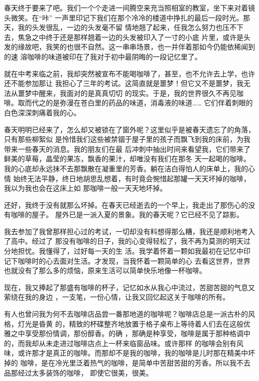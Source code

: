 \documentclass[12pt,a4paper]{article}
\begin{document}
		春天终于要来了吧。我们一个个走进一间腾空来充当照相室的教室，坐下来对着镜头微笑。在“咔”
	一声里印记下我们在那个冷冷的楼道中挣扎的最后一段时光。那天，我的头发很乱，一边的头发毫不留
	情地翘了起来，任我怎么努力也压不下去，焦急之中终于还是那样翘着一边的头发被印入了一寸的小底
	片里，或许是头发的缘故吧，我笑的也很不自然。这一串串场景，也一并伴着那如今仍能依稀闻到的速
	溶咖啡的味道被印在了我对于初中最阴晦的一段记忆里了。

		就在中考来临之前，我却突然被宣布不能喝咖啡了，甚至，也不允许去上学，也许还不能参加那让
	我担心了三年的考试。这简直就是噩梦！但它又不是噩梦，我无法从噩梦中醒来，我面对的是真真切切
	的现实。于是，我的世界很久不再见咖啡。取而代之的是弥漫在苍白里的药品的味道，消毒液的味道……
	它们伴着刺眼的白色深深刺痛着我的心。

		春天明明已经来了，怎么却又被锁在了窗外呢？这里似乎是被春天遗忘了的角落，只有那些柳絮似
	是怜惜我们这些被禁锢于屋子里的孩子而飘飞到我的床前，为我带来一些春天的消息。我的朋友们在最
	后冲刺中抽出时间来看望我，它们带来了鲜美的草莓，晶莹的果冻，飘香的果汁，却唯没有我们在那冬
	天一起喝的咖啡。我的心底却永远抹不去那飘散在凝重里的芳香。躺在洁白得怕人的床单上，我的心情
	始终无法平静，终日地胡思乱想着，有时竟会惋惜起那罐一天天坏掉的咖啡，我以为我也会在这床上如
	那咖啡一般一天天地坏掉。

		还好，我终于没有就那么坏掉。在春天已经逝去的一个早上，我走出了那伤心的没有咖啡的屋子。
	屋外已是一派入夏的景象。我的春天呢？它已经不见了踪影。

		我去参加了我曾那样担心过的考试，一切却没有料想得那么糟，我还是顺利地考入了高中。经过了
	那没有咖啡的日子，我的心变得轻松了，我不再为莫测的明天过分地担忧。我懂得了，过好每一天的生
	活。我学着怀着一颗如我最初在记忆中印记下咖啡时的心去面对生活。才发现，当我怀着一颗简单的心
	去看这世界，世界也就没有了那么多的烦恼，原来生活可以简单快乐地像一杯咖啡。

		现在，我又捧起了那盛有咖啡的杯子，记忆如水从我心中流过，苦甜苦甜的气息又萦绕在我的身边
	，一支笔，一份心情，让我又回忆起这关于咖啡的所有。

		有人也曾问我为何不去咖啡店品尝一番那地道的咖啡呢？咖啡店总是一派古朴的风格，灯光是昏黄
	的，精致的杯碟整齐地放置于格子桌布上等待着人们去在这般优雅之中享受那份情调，那份醇香。的确
	，那确是种享受，咖啡是属于那种格调中的，而我却从未走进过咖啡店点上一杯来临窗品味。或许那样
	的咖啡会别有风味，或许那才是真正的咖啡。而那却不是我的咖啡，我的咖啡是儿时那在精美中坏掉的
	咖啡，是在冷光里泛着热气的咖啡，是简单中苦甜苦甜的芳香。所以我不去品那经过太多装饰的咖啡，
	即使它很美，很美。
\end{document}
